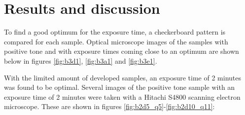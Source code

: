 \section*{Results and discussion}

To find a good optimum for the exposure time, a checkerboard pattern is compared for each sample. Optical microscope images of the samples with positive tone and with exposure times coming close to an optimum are shown  below in figures \ref{fig:b3d1}, \ref{fig:b3a1} and \ref{fig:b3e1}.

With the limited amount of developed samples, an exposure time of 2 minutes was found to be optimal. Several images of the positive tone sample with an exposure time of 2 minutes were taken with a Hitachi S4800 scanning electron microscope. These are shown in figures \ref{fig:b2d5_q5}-\ref{fig:b2d10_q11}:

